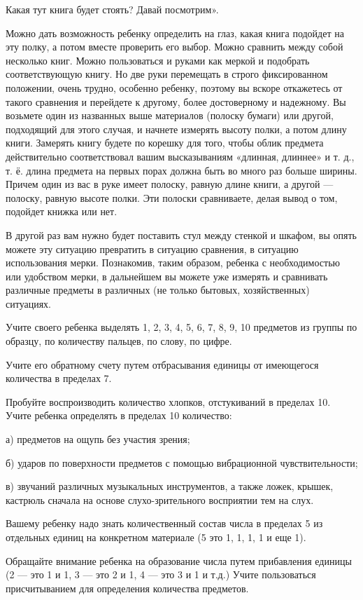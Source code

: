 \documentclass[a5paper]{book}
\begin{document}
Какая тут книга будет стоять? Давай посмотрим».

Можно дать возможность ребенку определить на глаз, какая книга подойдет
на эту полку, а потом вместе проверить его выбор. Можно сравнить между
собой несколько книг. Можно пользоваться и руками как меркой и подобрать
соответствующую книгу. Но две руки перемещать в строго фиксированном
положении, очень трудно, особенно ребенку, поэтому вы вскоре откажетесь
от такого сравнения и перейдете к другому, более достоверному и
надежному. Вы возьмете один из названных выше материалов (полоску
бумаги) или другой, подходящий для этого случая, и начнете измерять
высоту полки, а потом длину книги. Замерять книгу будете по корешку для
того, чтобы облик предмета действительно соответствовал вашим
высказываниям «длинная, длиннее» и т. д., т. ё. длина предмета на первых
порах должна быть во много раз больше ширины. Причем один из вас в руке
имеет полоску, равную длине книги, а другой --- полоску, равную высоте
полки. Эти полоски сравниваете, делая вывод о том, подойдет книжка или
нет.

В другой раз вам нужно будет поставить стул между стенкой и шкафом, вы
опять можете эту ситуацию превратить в ситуацию сравнения, в ситуацию
использования мерки. Познакомив, таким образом, ребенка с необходимостью
или удобством мерки, в дальнейшем вы можете уже измерять и сравнивать
различные предметы в различных (не только бытовых, хозяйственных)
ситуациях.

Учите своего ребенка выделять 1, 2, 3, 4, 5, 6, 7, 8, 9, 10 предметов из
группы по образцу, по количеству пальцев, по слову, по цифре.

Учите его обратному счету путем отбрасывания единицы от имеющегося
количества в пределах 7.

Пробуйте воспроизводить количество хлопков, отстукиваний в пределах 10.
Учите ребенка определять в пределах 10 количество:

а) предметов на ощупь без участия зрения;

б) ударов по поверхности предметов с помощью вибрационной
чувствительности;

в) звучаний различных музыкальных инструментов, а также ложек, крышек,
кастрюль сначала на основе слухо-зрительного восприятии тем на слух.

Вашему ребенку надо знать количественный состав числа в пределах 5 из
отдельных единиц на конкретном материале (5 это 1, 1, 1, 1 и еще 1).

Обращайте внимание ребенка на образование числа путем прибавления
единицы (2 --- это 1 и 1, 3 --- это 2 и 1, 4 --- это 3 и 1 и т.д.) Учите
пользоваться присчитыванием для определения количества предметов.
\end{document}

